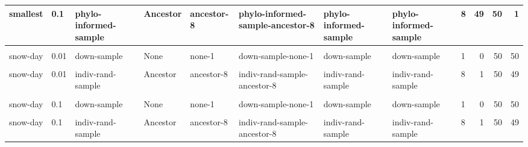 \documentclass[
]{book}
\begin{document}
\begin{table}
\begin{tabular}{l|l|l|l|l|l|l|l|l|r|r|r}
\hline
smallest & 0.1 & phylo-informed-sample & Ancestor & ancestor-8 & phylo-informed-sample-ancestor-8 & phylo-informed-sample & phylo-informed-sample & 8 & 49 & 50 & 1\\
\hline
\cellcolor{gray!6}{smallest} & \cellcolor{gray!6}{1} & \cellcolor{gray!6}{full} & \cellcolor{gray!6}{None} & \cellcolor{gray!6}{none-1} & \cellcolor{gray!6}{full-none-1} & \cellcolor{gray!6}{full} & \cellcolor{gray!6}{full} & \cellcolor{gray!6}{1} & \cellcolor{gray!6}{51} & \cellcolor{gray!6}{100} & \cellcolor{gray!6}{49}\\
\hline
snow-day & 0.01 & down-sample & None & none-1 & down-sample-none-1 & down-sample & down-sample & 1 & 0 & 50 & 50\\
\hline
\cellcolor{gray!6}{snow-day} & \cellcolor{gray!6}{0.01} & \cellcolor{gray!6}{down-sample} & \cellcolor{gray!6}{Ancestor} & \cellcolor{gray!6}{ancestor-8} & \cellcolor{gray!6}{down-sample-ancestor-8} & \cellcolor{gray!6}{down-sample} & \cellcolor{gray!6}{down-sample-ancestor} & \cellcolor{gray!6}{8} & \cellcolor{gray!6}{3} & \cellcolor{gray!6}{50} & \cellcolor{gray!6}{47}\\
\hline
snow-day & 0.01 & indiv-rand-sample & Ancestor & ancestor-8 & indiv-rand-sample-ancestor-8 & indiv-rand-sample & indiv-rand-sample & 8 & 1 & 50 & 49\\
\hline
\cellcolor{gray!6}{snow-day} & \cellcolor{gray!6}{0.01} & \cellcolor{gray!6}{phylo-informed-sample} & \cellcolor{gray!6}{Ancestor} & \cellcolor{gray!6}{ancestor-8} & \cellcolor{gray!6}{phylo-informed-sample-ancestor-8} & \cellcolor{gray!6}{phylo-informed-sample} & \cellcolor{gray!6}{phylo-informed-sample} & \cellcolor{gray!6}{8} & \cellcolor{gray!6}{1} & \cellcolor{gray!6}{50} & \cellcolor{gray!6}{49}\\
\hline
snow-day & 0.1 & down-sample & None & none-1 & down-sample-none-1 & down-sample & down-sample & 1 & 0 & 50 & 50\\
\hline
\cellcolor{gray!6}{snow-day} & \cellcolor{gray!6}{0.1} & \cellcolor{gray!6}{down-sample} & \cellcolor{gray!6}{Ancestor} & \cellcolor{gray!6}{ancestor-8} & \cellcolor{gray!6}{down-sample-ancestor-8} & \cellcolor{gray!6}{down-sample} & \cellcolor{gray!6}{down-sample-ancestor} & \cellcolor{gray!6}{8} & \cellcolor{gray!6}{0} & \cellcolor{gray!6}{50} & \cellcolor{gray!6}{50}\\
\hline
snow-day & 0.1 & indiv-rand-sample & Ancestor & ancestor-8 & indiv-rand-sample-ancestor-8 & indiv-rand-sample & indiv-rand-sample & 8 & 1 & 50 & 49\\

\end{tabular}
\end{table}
\end{document}
